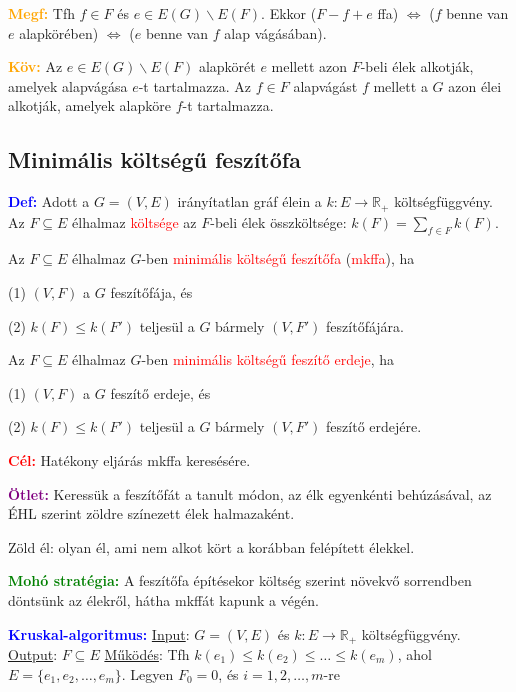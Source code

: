 \documentclass[12pt]{article}
\begin{document}
			\textcolor{orange}{\textbf{Megf:}} Tfh $f \in F$ és $e \in E(G) \backslash E(F)$. Ekkor ($F-f+e$ ffa) $\Longleftrightarrow$ ($f$ benne van $e$ alapkörében) $\Longleftrightarrow$ ($e$ benne van $f$ alap vágásában).

			\textcolor{orange}{\textbf{Köv:}} Az $e \in E(G) \backslash E(F)$ alapkörét $e$ mellett azon $F$-beli élek alkotják, amelyek alapvágása $e$-t tartalmazza. Az $f \in F$ alapvágást $f$ mellett a $G$ azon élei alkotják, amelyek alapköre $f$-t tartalmazza.

		\subsection{Minimális költségű feszítőfa}

			\textcolor{blue}{\textbf{Def:}} Adott a $G = (V,E)$ irányítatlan gráf élein a $k:E \rightarrow \mathbb{R}_+$ költségfüggvény. Az $F \subseteq E$ élhalmaz \textcolor{red}{költsége} az $F$-beli élek összköltsége: $k(F) = \sum_{f\in F}k(F)$.

			Az $F \subseteq E$ élhalmaz $G$-ben \textcolor{red}{minimális költségű feszítőfa} (\textcolor{red}{mkffa}), ha 

			(1) $(V,F)$ a $G$ feszítőfája, és
			
			(2) $k(F) \leq k(F')$ teljesül a $G$ bármely $(V,F')$ feszítőfájára.
			
			Az $F \subseteq E$ élhalmaz $G$-ben \textcolor{red}{minimális költségű feszítő erdeje}, ha 

			(1) $(V,F)$ a $G$ feszítő erdeje, és

			(2) $k(F) \leq k(F')$ teljesül a $G$ bármely $(V,F')$ feszítő erdejére.

			\textcolor{red}{\textbf{Cél:}} Hatékony eljárás mkffa keresésére.
			
			\textcolor{purple}{\textbf{Ötlet:}} Keressük a feszítőfát a tanult módon, az élk egyenkénti behúzásával, az ÉHL szerint zöldre színezett élek halmazaként. 

			Zöld él: olyan él, ami nem alkot kört a korábban felépített élekkel.

			\textcolor{green}{\textbf{Mohó stratégia:}} A feszítőfa építésekor költség szerint növekvő sorrendben döntsünk az élekről, hátha mkffát kapunk a végén.

			\textcolor{blue}{\textbf{Kruskal-algoritmus:}} \underline{Input}: $G=(V,E)$ és $k:E \rightarrow \mathbb{R}_+$ költségfüggvény. \underline{Output}: $F \subseteq E$ \underline{Működés}: Tfh $k(e_1) \leq k(e_2) \leq \dots \leq k(e_m)$, ahol $E=\{e_1,e_2,\dots, e_m\}$. Legyen $F_0=0$, és $i=1,2,\dots,m$-re
\end{document}
